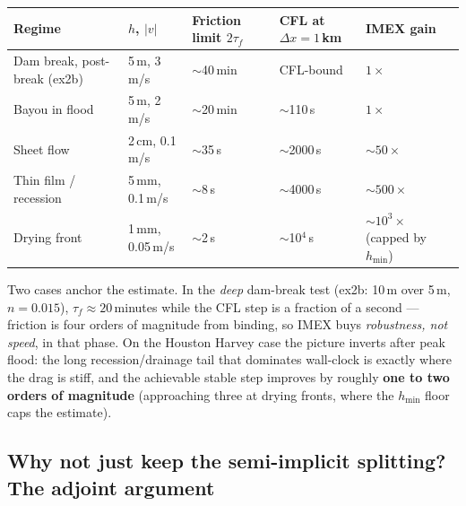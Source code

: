 \documentclass[11pt]{article}
\begin{document}
\begin{center}
\begin{tabular}{@{}lllll@{}}
\toprule
Regime & $h$, $|v|$ & Friction limit $2\tau_f$ &
  CFL at $\Delta x{=}1$\,km & IMEX gain \\
\midrule
Dam break, post-break (ex2b) & 5\,m, 3\,m/s & $\sim$40\,min & CFL-bound
  & $1\times$ \\
Bayou in flood & 5\,m, 2\,m/s & $\sim$20\,min & $\sim$110\,s & $1\times$ \\
Sheet flow & 2\,cm, 0.1\,m/s & $\sim$35\,s & $\sim$2000\,s & $\sim50\times$ \\
Thin film / recession & 5\,mm, 0.1\,m/s & $\sim$8\,s & $\sim$4000\,s &
  $\sim500\times$ \\
Drying front & 1\,mm, 0.05\,m/s & $\sim$2\,s & $\sim$10$^4$\,s &
  $\sim10^3\times$ (capped by $h_{\min}$) \\
\bottomrule
\end{tabular}
\end{center}

Two cases anchor the estimate. In the \emph{deep} dam-break test (ex2b:
10\,m over 5\,m, $n=0.015$), $\tau_f \approx 20$\,minutes while the CFL
step is a fraction of a second --- friction is four orders of magnitude
from binding, so IMEX buys \emph{robustness, not speed}, in that phase.
On the Houston Harvey case the picture inverts after peak flood: the
long recession/drainage tail that dominates wall-clock is exactly where
the drag is stiff, and the achievable stable step improves by roughly
\textbf{one to two orders of magnitude} (approaching three at drying
fronts, where the $h_{\min}$ floor caps the estimate).

\subsection*{Why not just keep the semi-implicit splitting? The adjoint
argument}
\end{document}

